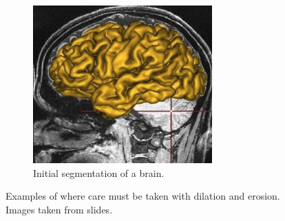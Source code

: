 \begin{figure}[h]
\begin{subfigure}{0.3\linewidth}
		\includegraphics[width=\linewidth]{Materials/brain}
		\caption{Initial segmentation of a brain.}
		\label{brain}
	\end{subfigure}
	\caption{Examples of where care must be taken with dilation and erosion. Images taken from slides.}
\end{figure}